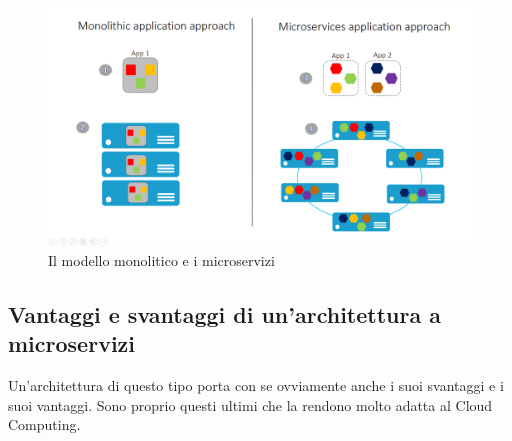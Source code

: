 \begin{figure}[h!]
	\centering
	\includegraphics[width=\textwidth,keepaspectratio=true]{capitoli/imgs/monosvmicro.png}
	\caption{Il modello monolitico e i microservizi}
\end{figure}

\subsection{Vantaggi e svantaggi di un'architettura a microservizi}
Un'architettura di questo tipo porta con se ovviamente anche i suoi svantaggi e i suoi vantaggi. Sono proprio questi ultimi che la rendono molto adatta al Cloud Computing.


